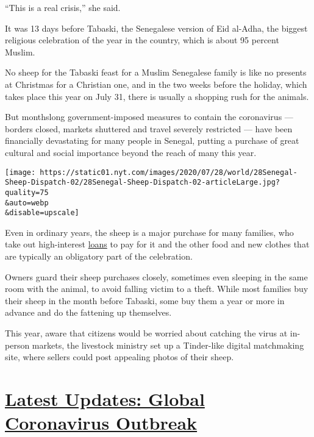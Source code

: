 ``This is a real crisis,'' she said.

It was 13 days before Tabaski, the Senegalese version of Eid al-Adha,
the biggest religious celebration of the year in the country, which is
about 95 percent Muslim.

No sheep for the Tabaski feast for a Muslim Senegalese family is like no
presents at Christmas for a Christian one, and in the two weeks before
the holiday, which takes place this year on July 31, there is usually a
shopping rush for the animals.

But monthslong government-imposed measures to contain the coronavirus
--- borders closed, markets shuttered and travel severely restricted ---
have been financially devastating for many people in Senegal, putting a
purchase of great cultural and social importance beyond the reach of
many this year.

\texttt{[image: https://static01.nyt.com/images/2020/07/28/world/28Senegal-Sheep-Dispatch-02/28Senegal-Sheep-Dispatch-02-articleLarge.jpg?quality=75\\\&auto=webp\\\&disable=upscale]}

Even in ordinary years, the sheep is a major purchase for many families,
who take out high-interest
\href{https://www.boaniger.com/particuliers/prets/pret-tabaski/}{loans}
to pay for it and the other food and new clothes that are typically an
obligatory part of the celebration.

Owners guard their sheep purchases closely, sometimes even sleeping in
the same room with the animal, to avoid falling victim to a theft. While
most families buy their sheep in the month before Tabaski, some buy them
a year or more in advance and do the fattening up themselves.

This year, aware that citizens would be worried about catching the virus
at in-person markets, the livestock ministry set up a Tinder-like
digital matchmaking site, where sellers could post appealing photos of
their sheep.

\hypertarget{latest-updates-global-coronavirus-outbreak}{%
\section{\texorpdfstring{\href{https://www.nytimes.com/2020/08/03/world/coronavirus-covid-19.html?action=click\&pgtype=Article\&state=default\&region=MAIN_CONTENT_1\&context=storylines_live_updates}{Latest
Updates: Global Coronavirus
Outbreak}}{Latest Updates: Global Coronavirus Outbreak}}\label{latest-updates-global-coronavirus-outbreak}}

